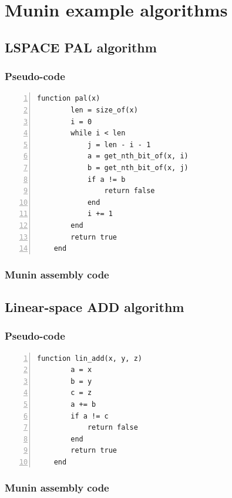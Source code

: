 \documentclass[11pt, a4paper]{article}
\begin{document}
\newpage

\onecolumn

\appendix

\section{Munin example algorithms}

\subsection{LSPACE PAL algorithm}\label{app:pal}

\subsubsection{Pseudo-code}

\begin{lstlisting}[numbers=left]
    function pal(x)
        len = size_of(x)
        i = 0
        while i < len
            j = len - i - 1
            a = get_nth_bit_of(x, i)
            b = get_nth_bit_of(x, j)
            if a != b
                return false
            end
            i += 1
        end
        return true
    end
\end{lstlisting}

\subsubsection{Munin assembly code}



\subsection{Linear-space ADD algorithm}\label{app:linAdd}

\subsubsection{Pseudo-code}

\begin{lstlisting}[numbers=left]
    function lin_add(x, y, z)
        a = x
        b = y
        c = z
        a += b
        if a != c
            return false
        end
        return true
    end
\end{lstlisting}

\subsubsection{Munin assembly code}
\end{document}
